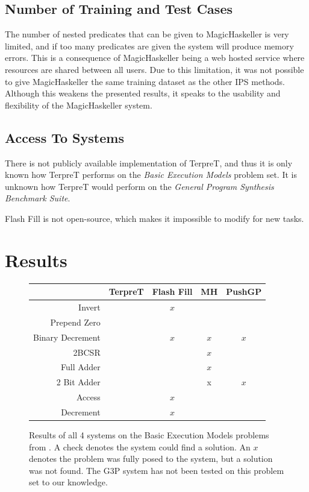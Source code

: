 \subsection{Number of Training and Test Cases}

The number of nested predicates that can be given to MagicHaskeller is very limited, and if too many predicates are given the system will produce memory errors. This is a consequence of MagicHaskeller being a web hosted service where resources are shared between all users. Due to this limitation, it was not possible to give MagicHaskeller the same training dataset as the other IPS methods. Although this weakens the presented results, it speaks to the usability and flexibility of the MagicHaskeller system.

\subsection{Access To Systems}

There is not publicly available implementation of TerpreT, and thus it is only known how TerpreT performs on the \emph{Basic Execution Models} problem set. It is unknown how TerpreT would perform on the \emph{General Program Synthesis Benchmark Suite}.

Flash Fill is not open-source, which makes it impossible to modify for new tasks.


\section{Results}


\begin{figure}
\begin{tabular}{ r | c c c c }
	& TerpreT & Flash Fill & MH & PushGP \\
	\hline
	Invert & \checkmark & $x$ & \checkmark & \checkmark \\
	Prepend Zero & \checkmark & \checkmark & \checkmark & \checkmark \\
	Binary Decrement & \checkmark & $x$ & $x$ & $x$ \\
	2BCSR & \checkmark &  & $x$ & \checkmark \\
	Full Adder & \checkmark &  & $x$ & \checkmark \\
	2 Bit Adder & \checkmark &  & x & $x$ \\
	Access & \checkmark & $x$ & \checkmark & \checkmark \\
	Decrement & \checkmark & $x$ & \checkmark & \checkmark \\
\end{tabular}
\caption{Results of all 4 systems on the Basic Execution Models problems from \cite{Gaunt2016}.  A check denotes the system could find a solution. An $x$ denotes the problem was fully posed to the system, but a solution was not found. The G3P system has not been tested on this problem set to our knowledge.}
\label{fig:results1}
\end{figure}

